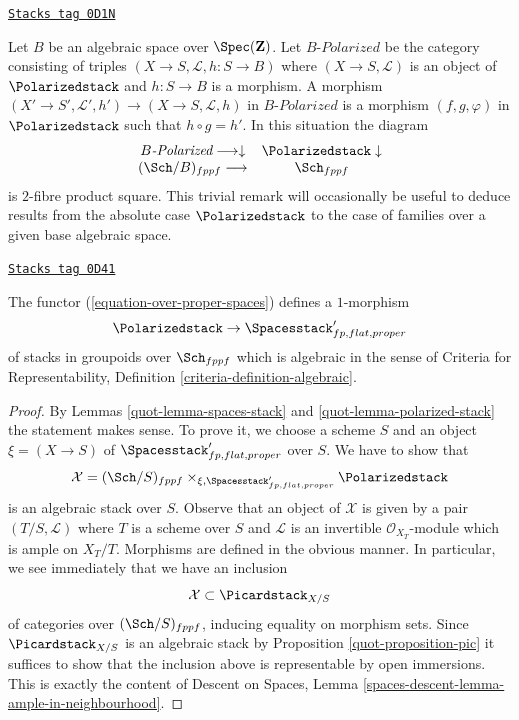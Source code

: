 \begin{remark}
\label{quot-remark-polarized-base-change}
\href{https://stacks.math.columbia.edu/tag/0D1N}{\texttt{Stacks tag 0D1N}}

Let $B$ be an algebraic space over $\Spec(\mathbf{Z})$.
Let $B\textit{-Polarized}$ be the category consisting
of triples $(X \to S, \mathcal{L}, h : S \to B)$
where $(X \to S, \mathcal{L})$ is an object of
$\Polarizedstack$ and $h : S \to B$ is a morphism.
A morphism $(X' \to S', \mathcal{L}', h') \to (X \to S, \mathcal{L}, h)$
in $B\textit{-Polarized}$ is a morphism $(f, g, \varphi)$
in $\Polarizedstack$ such that $h \circ g = h'$.
In this situation the diagram
$$
\begin{array}{cc}B\textit{-Polarized} \longrightarrow\downarrow & \Polarizedstack \downarrow \\ (\Sch/B)_{fppf} \longrightarrow & \Sch_{fppf}\end{array}
$$
is $2$-fibre product square. This trivial remark
will occasionally be useful to deduce results from
the absolute case $\Polarizedstack$ to the case
of families over a given base algebraic space.
\end{remark}

\begin{lemma}
\label{quot-lemma-polarized-to-spaces-algebraic}
\href{https://stacks.math.columbia.edu/tag/0D41}{\texttt{Stacks tag 0D41}}

The functor (\ref{equation-over-proper-spaces}) defines a $1$-morphism
$$
\Polarizedstack \to \Spacesstack'_{fp, flat, proper}
$$
of stacks in groupoids over $\Sch_{fppf}$
which is algebraic in the sense of
Criteria for Representability, Definition
\ref{criteria-definition-algebraic}.
\end{lemma}

\begin{proof}

By Lemmas \ref{quot-lemma-spaces-stack} and \ref{quot-lemma-polarized-stack}
the statement makes sense. To prove it, we choose a scheme $S$
and an object $\xi = (X \to S)$ of $\Spacesstack'_{fp, flat, proper}$
over $S$. We have to show that
$$
\mathcal{X} = (\Sch/S)_{fppf} \times_{\xi, \Spacesstack'_{fp, flat, proper}}
\Polarizedstack
$$
is an algebraic stack over $S$. Observe that an object of $\mathcal{X}$
is given by a pair $(T/S, \mathcal{L})$ where $T$ is a scheme
over $S$ and $\mathcal{L}$ is an invertible $\mathcal{O}_{X_T}$-module
which is ample on $X_T/T$. Morphisms are defined in the obvious manner.
In particular, we see immediately that we have an inclusion
$$
\mathcal{X} \subset \Picardstack_{X/S}
$$
of categories over $(\Sch/S)_{fppf}$, inducing equality on morphism
sets. Since $\Picardstack_{X/S}$ is an algebraic stack by
Proposition \ref{quot-proposition-pic} it suffices to show that the inclusion
above is representable by open immersions. This is exactly the content
of Descent on Spaces, Lemma
\ref{spaces-descent-lemma-ample-in-neighbourhood}.
\end{proof}

